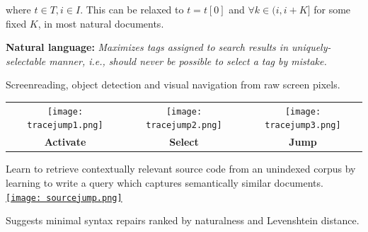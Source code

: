 \documentclass[portrait,a0b,final,a4resizeable]{a0poster}
\def\jointspacing{\vspace{0.3in}}
\begin{document}
\begin{poster}
\begin{multicols}{2}
\begin{minipage}[c]{0.90\columnwidth}
        where $t \in T, i \in I$. This can be relaxed to $t=t[0]$ and $\forall k \in (i, i+K]$ for some fixed $K$, in most natural documents.

        \vspace{10pt}
        \textbf{Natural language:}
        \textit{Maximizes tags assigned to search results in uniquely-selectable manner, i.e., should never be possible to select a tag by mistake.}
        \end{minipage}

        \jointspacing

        \null\hspace*{1.8cm}\begin{minipage}[c]{0.90\columnwidth}
                              Screenreading, object detection and visual navigation from raw screen pixels. \\

                              \hspace{-10pt}\begin{tabular}{ c c c }
                                  \texttt{[image: tracejump1.png]} &
                                  \texttt{[image: tracejump2.png]} &
                                  \texttt{[image: tracejump3.png]}\\
                                  \small{\textbf{Activate}} & \small{\textbf{Select}} & \small{\textbf{Jump}}
                              \end{tabular}
        \end{minipage}
        \jointspacing


        \null\hspace*{1.8cm}\begin{minipage}[c]{0.90\columnwidth}
                                Learn to retrieve contextually relevant source code from an unindexed corpus by learning to write a query which captures semantically similar documents.\\

                                \href{https://github.com/acejump/sourcejump}{\texttt{[image: sourcejump.png]}}\\
        \end{minipage}

        \jointspacing


        \null\hspace*{1.8cm}\begin{minipage}[c]{0.90\columnwidth}
                                Suggests minimal syntax repairs ranked by naturalness and Levenshtein distance.\\


\end{minipage}
\end{multicols}
\end{poster}
\end{document}
